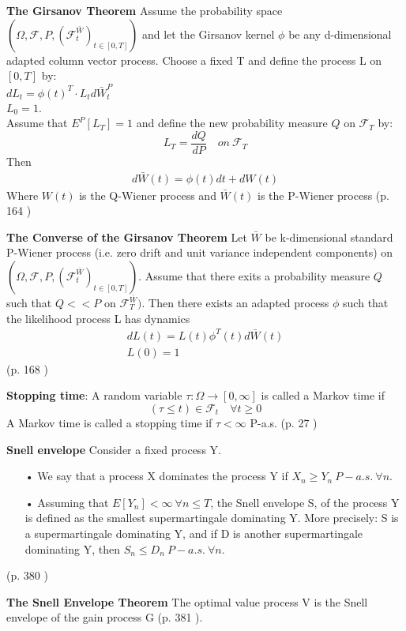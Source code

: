 \begin{theorem}\label{Girsanov}
\textbf{The Girsanov Theorem} 
Assume the probability space $(\Omega, \mathcal{F}, P, (\mathcal{F}_t^{\bar{W}})_{t \in [0,T]})$ and let the Girsanov kernel $\phi$ be any d-dimensional adapted column vector process. Choose a fixed T and define the process L on $[0,T]$ by:\\
$dL_t=\phi(t)^T\cdot L_t d\bar{W}_t^P$\\
$L_0=1$.\\
Assume that $E^P[L_T]=1$ and define the new probability measure $Q$ on $\mathcal{F}_T$ by:\\
$$L_T=\frac{dQ}{dP} \quad on \ \mathcal{F}_T$$
Then
\begin{align}
d\bar{W}(t)=\phi(t)dt + dW(t)
\end{align}
Where $W(t)$ is the Q-Wiener process and $\bar{W}(t)$ is the P-Wiener process
(p. 164 \parencite{finKont})
\end{theorem}

\begin{theorem}\label{ConverseGirsanov}
\textbf{The Converse of the Girsanov Theorem} Let $\bar{W}$ be k-dimensional standard P-Wiener process (i.e. zero drift and unit variance independent components) on $(\Omega,\mathcal{F}, P, (\mathcal{F}_t^{\bar{W}})_{t \in [0,T]})$. Assume that there exits a probability measure $Q$ such that $Q<<P$ on $\mathcal{F}_T^{\bar{W}})$. Then there exists an adapted process $\phi$ such that the likelihood process L has dynamics
\begin{align*}
dL(t)=L(t)\phi^T(t)d\bar{W}(t)\\
L(0)=1
\end{align*}
(p. 168 \parencite{finKont})
\end{theorem}

\theoremstyle{definition}
\begin{definition}{\textbf{Stopping time}:}\label{StoppingTime}
A random variable $\tau:\Omega \to [0,\infty]$ is called a Markov time if 
$$(\tau \leq t)\in \mathcal{F}_{t} \quad \forall t \geq 0 $$
A Markov time is called a stopping time if $\tau<\infty$ P-a.s.
(p. 27 \parencite{Shiryaev06})
\end{definition}


\theoremstyle{definition}
\begin{definition}{\textbf{Snell envelope}}\label{snellEnvelope}
Consider a fixed process Y.
\begin{enumerate}
\item[•] We say that a process X dominates the process Y if $X_n \geq Y_n \ P-a.s. \ \forall n$.
\item[•] Assuming that $E[Y_n] < \infty  \ \forall n \leq T$, the Snell envelope S, of the process Y is defined as the smallest supermartingale dominating Y. More precisely: S is a supermartingale dominating Y, and if D is another supermartingale dominating Y, then $S_n\leq D_n \ P-a.s. \ \forall n$.
\end{enumerate}
(p. 380 \parencite{Bjork19})
\end{definition}

\begin{theorem}\label{SnellEnvelopeTheorem}
\textbf{The Snell Envelope Theorem} The optimal value process V is the Snell envelope of the gain process G (p. 381  \parencite{Bjork19}).
\end{theorem}
